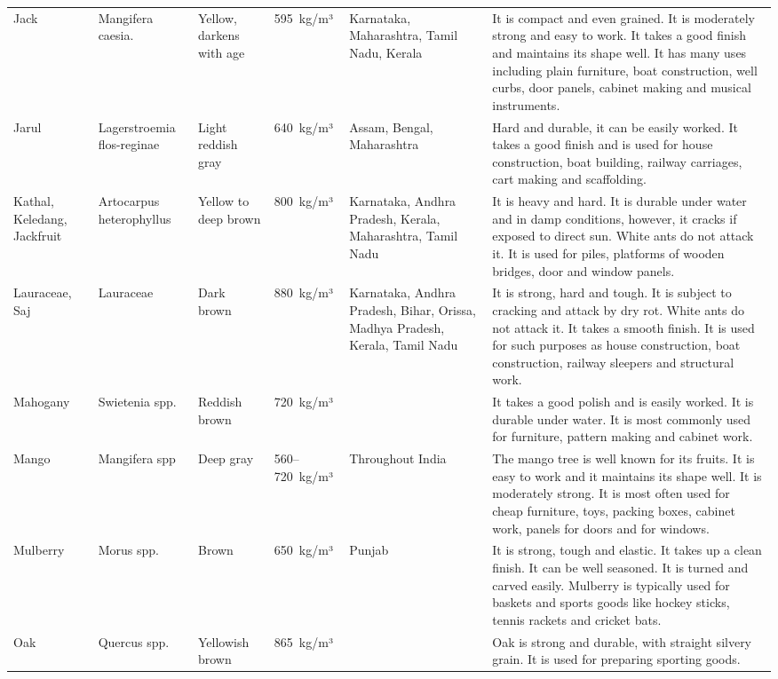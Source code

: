 \documentclass{article}
\begin{document}
\begin{tabular}{llllll}
Jack & Mangifera caesia. & Yellow, darkens with age & 595 kg/m³ & Karnataka, Maharashtra, Tamil Nadu, Kerala & It is compact and even grained. It is moderately strong and easy to work. It takes a good finish and maintains its shape well. It has many uses including plain furniture, boat construction, well curbs, door panels, cabinet making and musical instruments. \\
Jarul & Lagerstroemia flos-reginae & Light reddish gray & 640 kg/m³ & Assam, Bengal, Maharashtra & Hard and durable, it can be easily worked. It takes a good finish and is used for house construction, boat building, railway carriages, cart making and scaffolding. \\
Kathal, Keledang, Jackfruit & Artocarpus heterophyllus & Yellow to deep brown & 800 kg/m³ & Karnataka, Andhra Pradesh, Kerala, Maharashtra, Tamil Nadu & It is heavy and hard. It is durable under water and in damp conditions, however, it cracks if exposed to direct sun. White ants do not attack it. It is used for piles, platforms of wooden bridges, door and window panels. \\
Lauraceae, Saj & Lauraceae & Dark brown & 880 kg/m³ & Karnataka, Andhra Pradesh, Bihar, Orissa, Madhya Pradesh, Kerala, Tamil Nadu & It is strong, hard and tough. It is subject to cracking and attack by dry rot. White ants do not attack it. It takes a smooth finish. It is used for such purposes as house construction, boat construction, railway sleepers and structural work. \\
Mahogany & Swietenia spp. & Reddish brown & 720 kg/m³ &  & It takes a good polish and is easily worked. It is durable under water. It is most commonly used for furniture, pattern making and cabinet work. \\
Mango & Mangifera spp & Deep gray & 560–720 kg/m³ & Throughout India & The mango tree is well known for its fruits. It is easy to work and it maintains its shape well. It is moderately strong. It is most often used for cheap furniture, toys, packing boxes, cabinet work, panels for doors and for windows. \\
Mulberry & Morus spp. & Brown & 650 kg/m³ & Punjab & It is strong, tough and elastic. It takes up a clean finish. It can be well seasoned. It is turned and carved easily. Mulberry is typically used for baskets and sports goods like hockey sticks, tennis rackets and cricket bats. \\
Oak & Quercus spp. & Yellowish brown & 865 kg/m³ &  & Oak is strong and durable, with straight silvery grain. It is used for preparing sporting goods. \\

\end{tabular}
\end{document}
